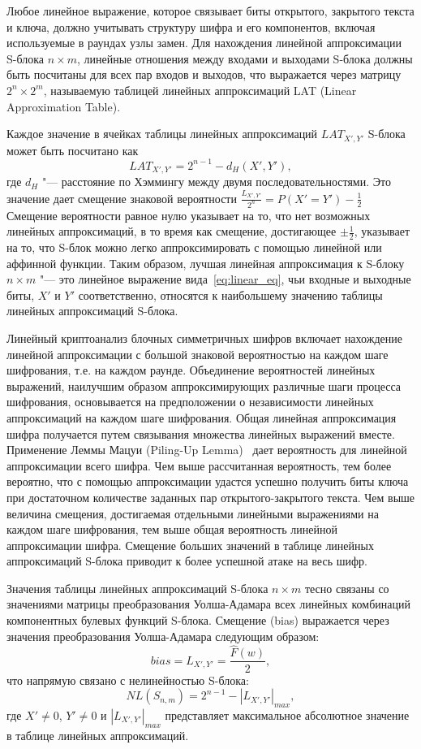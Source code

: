 Любое линейное выражение, которое связывает биты открытого, закрытого текста и
ключа, должно учитывать структуру шифра и его компонентов, включая используемые
в раундах узлы замен. Для нахождения линейной аппроксимации S-блока $n \times
m$, линейные отношения между входами и выходами S-блока должны быть посчитаны
для всех пар входов и выходов, что выражается через матрицу $2^n \times 2^m$,
называемую таблицей линейных аппроксимаций LAT (Linear Approximation Table).

Каждое значение в ячейках таблицы линейных аппроксимаций $LAT_{X',Y'}$ S-блока
может быть посчитано как
\begin{equation}LAT_{X',Y'}=2^{n-1}-d_H(X', Y'),\end{equation}
где $d_H$ "--- расстояние по Хэммингу между двумя последовательностями. Это
значение дает смещение знаковой вероятности $\frac{L_{X', Y'}}{2^n} = P(X' = Y')
-\frac{1}{2}$ Смещение вероятности равное нулю указывает на то, что нет
возможных линейных аппроксимаций, в то время как смещение, достигающее $\pm
\frac{1}{2}$, указывает на то, что S-блок можно легко аппроксимировать с помощью
линейной или аффинной функции. Таким образом, лучшая линейная аппроксимация к
S-блоку $n \times m$ "--- это линейное выражение вида~\ref{eq:linear_eq}, чьи
входные и выходные биты, $X'$ и $Y'$ соответственно, относятся к наибольшему
значению таблицы линейных аппроксимаций S-блока.

Линейный криптоанализ блочных симметричных шифров включает нахождение линейной
аппроксимации с большой знаковой вероятностью на каждом шаге шифрования, т.е. на
каждом раунде. Объединение вероятностей линейных выражений, наилучшим образом
аппроксимирующих различные шаги процесса шифрования, основывается на
предположении о независимости линейных аппроксимаций на каждом шаге шифрования.
Общая линейная аппроксимация шифра получается путем связывания множества
линейных выражений вместе. Применение Леммы Мацуи (Piling-Up
Lemma)~\cite{Matsui} дает вероятность для линейной аппроксимации всего шифра.
Чем выше рассчитанная вероятность, тем более вероятно, что с помощью
аппроксимации удастся успешно получить биты ключа при достаточном количестве
заданных пар открытого-закрытого текста. Чем выше величина смещения, достигаемая
отдельными линейными выражениями на каждом шаге шифрования, тем выше общая
вероятность линейной аппроксимации шифра. Смещение больших значений в таблице
линейных аппроксимаций S-блока приводит к более успешной атаке на весь шифр.

Значения таблицы линейных аппроксимаций S-блока $n \times m$ тесно связаны со
значениями матрицы преобразования Уолша-Адамара всех линейных комбинаций
компонентных булевых функций S-блока. Смещение (bias) выражается через значения
преобразования Уолша-Адамара следующим образом:
\begin{equation}bias = L_{X', Y'} = \frac{\hat{F}(w)}{2},\end{equation}
что напрямую связано с нелинейностью S-блока:
\begin{equation}NL(S_{n,m}) = 2^{n-1} - |L_{X', Y'}|_{max},\end{equation}
где $X' \neq 0$, $Y' \neq 0$ и $|L_{X',Y'}|_{max}$ представляет максимальное
абсолютное значение в таблице линейных аппроксимаций.

